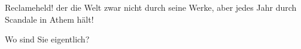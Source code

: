 \pstart
           Reclameheld! der die Welt zwar nicht durch seine Werke, aber jedes Jahr durch
               Scandale in Athem hält!\pend
           
\pstart
           Wo sind Sie eigentlich?\pend
           \endnumbering{}  \newcommand{\dateiname}{L01132}\newcommand{\titel}{Hugo von Hofmannsthal an Arthur Schnitzler, 24. 6. 1901}\newcommand{\editorInnen}{Martin Anton Müller und Gerd-Hermann Susen}
